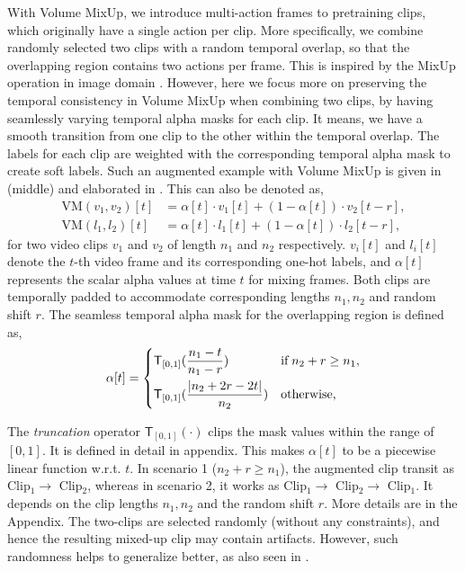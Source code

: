 \documentclass[letterpaper]{article} \usepackage{aaai23}  \usepackage{times}  \usepackage{helvet}  \usepackage{courier}  \usepackage[hyphens]{url}  \usepackage{graphicx} \urlstyle{rm} \def\UrlFont{\rm}  \usepackage{natbib}  \usepackage{caption} \frenchspacing  \setlength{\pdfpagewidth}{8.5in}  \setlength{\pdfpageheight}{11in}  \usepackage{algorithm}
\newcommand{\ch}{}
\begin{document}
With Volume MixUp, we introduce multi-action frames to pretraining clips, which originally have a single action per clip. More specifically, we combine randomly selected two clips with a random temporal overlap, so that the overlapping region contains two actions per frame. This is inspired by the MixUp operation in image domain \cite{zhang2017mixup}. However, here we focus more on preserving the temporal consistency in Volume MixUp when combining two clips, by having seamlessly varying temporal alpha masks for each clip. It means, we have a smooth transition from one clip to the other within the temporal overlap. The labels for each clip are weighted with the corresponding temporal alpha mask to create soft labels. Such an augmented example with Volume MixUp is given in  (middle) and elaborated in . This can also be denoted as,
{\small
\begin{align*}
    \text{VM}(v_1,v_2)[t] &= \alpha[t] \cdot v_1[t] + (1-\alpha[t]) \cdot v_2[t-r],\\
    \text{VM}(l_1,l_2)[t] &= \alpha[t] \cdot l_1[t] + (1-\alpha[t]) \cdot l_2[t-r],
\end{align*}
}for two video clips $v_1$ and $v_2$ of length $n_1$ and $n_2$ respectively. $v_i[t]$ and $l_i[t]$ denote the $t$-th video frame and its corresponding one-hot labels, and $\alpha[t]$ represents the scalar alpha values at time $t$ for mixing frames. Both clips are temporally padded to accommodate corresponding lengths $n_1, n_2$ and random shift $r$. \ch{The seamless temporal alpha mask for the overlapping region is defined as,}
{\small
\begin{equation*}
\label{eq:alpha}
\alpha[t]=
\begin{dcases}
\mathsf{T}_{[0,1]}(\frac{n_1-t}{n_1-r}) &\text{if}\; n_2+r\geq n_1,\\
\mathsf{T}_{[0,1]}(\frac{|n_2+2r-2t|}{n_2}) & \text{otherwise,}\\
\end{dcases}  
\end{equation*}
}

The \textit{truncation} operator $\mathsf{T}_{[0,1]}(\cdot)$ clips the mask values within the range of $[0,1]$. It is defined in detail in appendix. This makes $\alpha[t]$ to be a piecewise linear function w.r.t. $t$. 
In scenario 1 ($n_2+r\geq n_1$), the augmented clip transit as Clip$_1 \rightarrow$ Clip$_2$, whereas in scenario 2, it works as Clip$_1 \rightarrow$ Clip$_2 \rightarrow$ Clip$_1$. It depends on the clip lengths $n_1, n_2$ and the random shift $r$. More details are in the Appendix. \ch{The two-clips are selected randomly (without any constraints), and hence the resulting mixed-up clip may contain artifacts. However, such randomness helps to generalize better, as also seen in \cite{zhang2017mixup}.}
\end{document}
